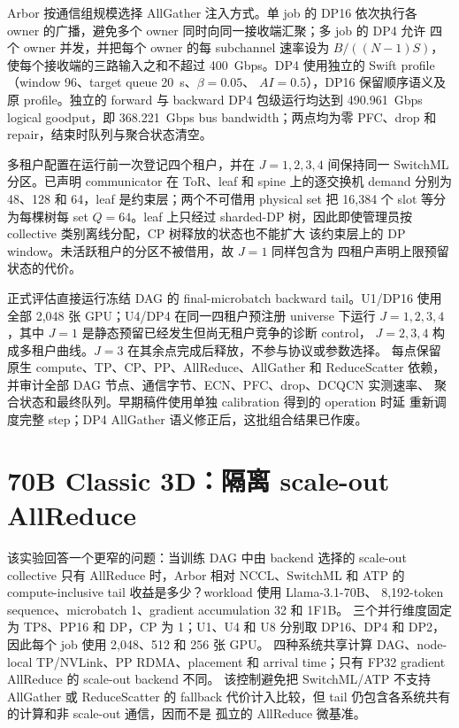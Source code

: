 Arbor 按通信组规模选择 AllGather 注入方式。单 job 的 DP16 依次执行各
owner 的广播，避免多个 owner 同时向同一接收端汇聚；多 job 的 DP4 允许
四个 owner 并发，并把每个 owner 的每 subchannel 速率设为
$B/((N-1)S)$，使每个接收端的三路输入之和不超过 400~Gbps。DP4 使用独立的
Swift profile（window 96、target queue 20~\textmu s、$\beta=0.05$、
$AI=0.5$），DP16 保留顺序语义及原 profile。独立的 forward 与 backward
DP4 包级运行均达到 490.961~Gbps logical goodput，即 368.221~Gbps bus
bandwidth；两点均为零 PFC、drop 和 repair，结束时队列与聚合状态清空。

多租户配置在运行前一次登记四个租户，并在 $J=1,2,3,4$ 间保持同一
SwitchML 分区。已声明 communicator 在 ToR、leaf 和 spine 上的逐交换机
demand 分别为 48、128 和 64，leaf 是约束层；两个不可借用 physical set
把 16,384 个 slot 等分为每棵树每 set $Q=64$。leaf 上只经过 sharded-DP
树，因此即使管理员按 collective 类别离线分配，CP 树释放的状态也不能扩大
该约束层上的 DP window。未活跃租户的分区不被借用，故 $J=1$ 同样包含为
四租户声明上限预留状态的代价。

正式评估直接运行冻结 DAG 的 final-microbatch backward tail。U1/DP16 使用
全部 2,048 张 GPU；U4/DP4 在同一四租户预注册 universe 下运行
$J=1,2,3,4$，其中 $J=1$ 是静态预留已经发生但尚无租户竞争的诊断 control，
$J=2,3,4$ 构成多租户曲线。$J=3$ 在其余点完成后释放，不参与协议或参数选择。
每点保留原生 compute、TP、CP、PP、AllReduce、AllGather 和 ReduceScatter
依赖，并审计全部 DAG 节点、通信字节、ECN、PFC、drop、DCQCN 实测速率、
聚合状态和最终队列。早期稿件使用单独 calibration 得到的 operation 时延
重新调度完整 step；DP4 AllGather 语义修正后，这批组合结果已作废。


\section{70B Classic 3D：隔离 scale-out AllReduce}
\label{ssec:llm-70b-classic-threed}

该实验回答一个更窄的问题：当训练 DAG 中由 backend 选择的 scale-out
collective 只有 AllReduce 时，Arbor 相对 NCCL、SwitchML 和 ATP 的
compute-inclusive tail 收益是多少？workload 使用 Llama-3.1-70B、
8,192-token sequence、microbatch 1、gradient accumulation 32 和 1F1B。
三个并行维度固定为 TP8、PP16 和 DP，CP 为 1；U1、U4 和 U8 分别取
DP16、DP4 和 DP2，因此每个 job 使用 2,048、512 和 256 张 GPU。
四种系统共享计算 DAG、node-local TP/NVLink、PP RDMA、placement 和
arrival time；只有 FP32 gradient AllReduce 的 scale-out backend 不同。
该控制避免把 SwitchML/ATP 不支持 AllGather 或 ReduceScatter 的 fallback
代价计入比较，但 tail 仍包含各系统共有的计算和非 scale-out 通信，因而不是
孤立的 AllReduce 微基准。

